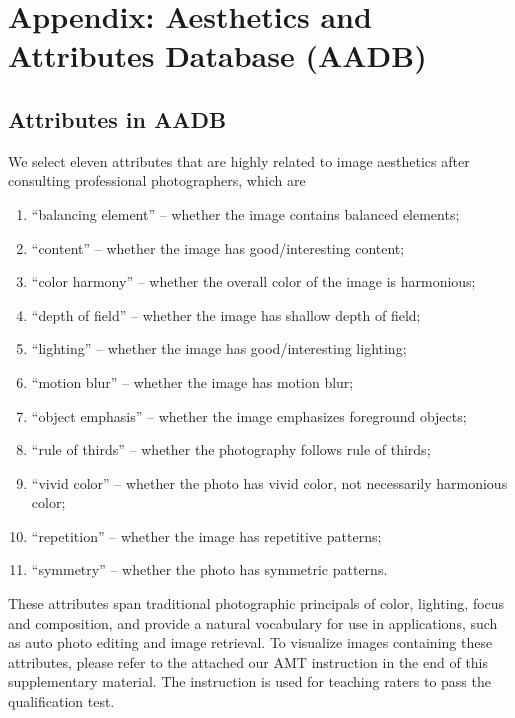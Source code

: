\documentclass[runningheads]{llncs}
\begin{document}



\clearpage


\section*{Appendix: Aesthetics and Attributes Database (AADB)}
\label{sec:AADB}

\subsection*{Attributes in AADB}
We select eleven attributes that are highly related to image aesthetics after consulting professional photographers,
which are
\begin{enumerate}
  \item ``balancing element'' -- whether the image contains balanced elements;
  \item ``content'' -- whether the image has good/interesting content;
  \item ``color harmony'' -- whether the overall color of the image is harmonious;
  \item ``depth of field'' -- whether the image has shallow depth of field;
  \item ``lighting'' -- whether the image has good/interesting lighting;
  \item ``motion blur'' -- whether the image has motion blur;
  \item ``object emphasis'' -- whether the image emphasizes foreground objects;
  \item ``rule of thirds'' -- whether the photography follows rule of thirds;
  \item ``vivid color'' -- whether the photo has vivid color, not necessarily harmonious color;
  \item ``repetition'' -- whether the image has repetitive patterns;
  \item ``symmetry'' -- whether the photo has symmetric patterns.
\end{enumerate}
These attributes span traditional photographic principals of color, lighting,
focus and composition, and provide a natural vocabulary for use in applications,
such as auto photo editing and image retrieval.
To visualize images containing these attributes,
please refer to the attached our AMT instruction in the end of this supplementary material.
The instruction is used for teaching raters to pass the qualification test.
\end{document}
